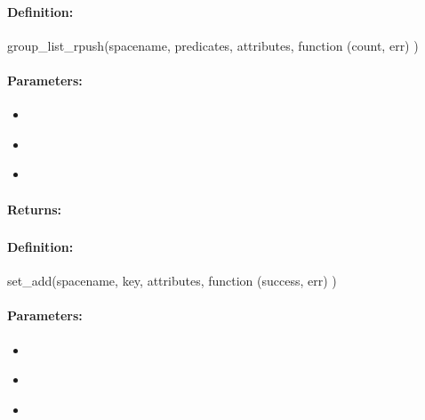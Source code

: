 \paragraph{Definition:}
\begin{javascriptcode}
group_list_rpush(spacename, predicates, attributes, function (count, err) {})
\end{javascriptcode}
\paragraph{Parameters:}
\begin{itemize}[noitemsep]
\item {}\\

\item {}\\

\item {}\\

\end{itemize}

\paragraph{Returns:}


\pagebreak
\subsubsection{}
\label{api:nodejs:set_add}


\paragraph{Definition:}
\begin{javascriptcode}
set_add(spacename, key, attributes, function (success, err) {})
\end{javascriptcode}
\paragraph{Parameters:}
\begin{itemize}[noitemsep]
\item {}\\

\item {}\\

\item {}\\

\end{itemize}

